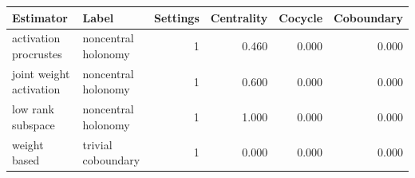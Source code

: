 \begin{tabular}{llrrrr}
\toprule
Estimator & Label & Settings & Centrality & Cocycle & Coboundary\\
\midrule
activation procrustes & noncentral holonomy & 1 & 0.460 & 0.000 & 0.000\\
joint weight activation & noncentral holonomy & 1 & 0.600 & 0.000 & 0.000\\
low rank subspace & noncentral holonomy & 1 & 1.000 & 0.000 & 0.000\\
weight based & trivial coboundary & 1 & 0.000 & 0.000 & 0.000\\
\bottomrule
\end{tabular}
